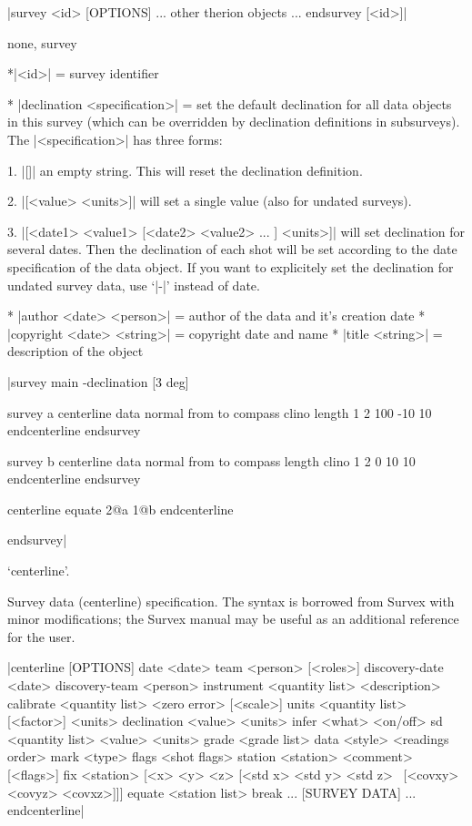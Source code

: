 \enddescription

\syntax
      |survey <id> [OPTIONS]
       ... other therion objects ...
       endsurvey [<id>]|
\endsyntax

\context
  none, survey
\endcontext

\arguments
*|<id>| = survey identifier
\endarguments

\options 
* |declination <specification>| = set the default declination for 
  all data objects in this survey (which can be overridden by
  declination definitions in subsurveys). The |<specification>| 
  has three forms:

  1. |[]| an empty string. This will reset the declination definition.

  2. |[<value> <units>]| will set a single value (also for undated surveys).

  3. |[<date1> <value1> [<date2> <value2> ... ] <units>]| 
     will set declination for several dates. Then the declination
     of each shot will be set according to the date specification
     of the data object. If you want to explicitely set the declination
     for undated survey data, use `|-|' instead of date.

* |author <date> <person>| = author of the data and it's creation date
* |copyright <date> <string>| = copyright date and name
* |title <string>| = description of the object
\endoptions

\example

|survey main -declination [3 deg]

  survey a
    centerline
      data normal from to compass clino length
      1 2 100 -10 10
    endcenterline
  endsurvey

  survey b
    centerline
      data normal from to compass length clino
      1 2 0 10 10
    endcenterline
  endsurvey

  centerline
    equate 2@a 1@b
  endcenterline

endsurvey|
\endexample      



\subsubchapter `centerline'.

\description
  Survey data (centerline) specification. The syntax is borrowed from Survex 
  with minor modifications; the Survex manual may be useful as an additional
  reference for the user.
\enddescription

\syntax
      |centerline [OPTIONS]
          date <date>
          team <person> [<roles>]
          discovery-date <date>
          discovery-team <person>
          instrument <quantity list> <description>
          calibrate <quantity list> <zero error> [<scale>]
          units <quantity list> [<factor>] <units>
          declination <value> <units>
          infer <what> <on/off>
          sd <quantity list> <value> <units>
          grade <grade list>
          data <style> <readings order>
          mark <type>
          flags <shot flags>
          station <station> <comment> [<flags>]
          fix <station> [<x> <y> <z> [<std x> <std y> <std z> \
            [<covxy> <covyz> <covxz>]]]
          equate <station list>
          break
          ...
          [SURVEY DATA]
          ...
        endcenterline|
\endsyntax

